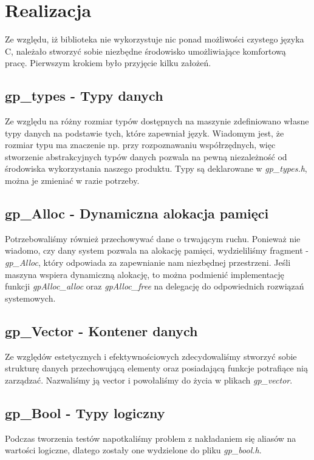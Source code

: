 \documentclass[a4paper,12pt]{article}
\begin{document}
\section{Realizacja}
Ze względu, iż biblioteka nie wykorzystuje nic ponad możliwości czystego języka C, należało stworzyć sobie niezbędne środowisko umożliwiające komfortową pracę. Pierwszym krokiem było przyjęcie kilku założeń.

\subsection{gp_types - Typy danych} Ze względu na różny rozmiar typów dostępnych na maszynie zdefiniowano własne typy danych na podstawie tych, które zapewniał język. Wiadomym jest, że rozmiar typu ma znaczenie np. przy rozpoznawaniu współrzędnych, więc stworzenie abstrakcyjnych typów danych pozwala na pewną niezależność od środowiska wykorzystania naszego produktu. Typy są deklarowane w \textit{gp_types.h}, można je zmieniać w razie potrzeby. 

\subsection{gp_Alloc - Dynamiczna alokacja pamięci} Potrzebowaliśmy również przechowywać dane o trwającym ruchu. Ponieważ nie wiadomo, czy dany system pozwala na alokację pamięci, wydzieliliśmy fragment - \textit{gp_Alloc}, który odpowiada za zapewnianie nam niezbędnej przestrzeni. Jeśli maszyna wspiera dynamiczną alokację, to można podmienić implementację funkcji \textit{gpAlloc_alloc} oraz \textit{gpAlloc_free} na delegację do odpowiednich rozwiązań systemowych. 

\subsection{gp_Vector - Kontener danych}Ze względów estetycznych i efektywnościowych zdecydowaliśmy stworzyć sobie strukturę danych przechowującą elementy oraz posiadającą funkcje potrafiące nią zarządzać. Nazwaliśmy ją vector i powołaliśmy do życia w plikach \textit{gp_vector}. 

\subsection{gp_Bool - Typy logiczny} Podczas tworzenia testów napotkaliśmy problem z nakładaniem się aliasów na wartości logiczne, dlatego zostały one wydzielone do pliku \textit{gp_bool.h}. 
\end{document}
